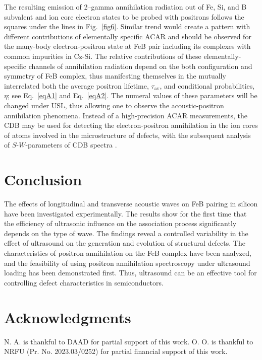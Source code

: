 \documentclass{ttp}
\begin{document}
The resulting emission of 2–gamma annihilation radiation out of Fe, Si, and B subvalent and ion core electron states
to be probed with positrons follows the squares under the lines in Fig.~\ref{fig6}.
Similar trend would create a pattern with different contributions of elementally specific ACAR
and should be observed for the many-body electron-positron state at FeB pair including its complexes with common impurities in Cz-Si.
The relative contributions of these elementally-specific channels of annihilation radiation depend on the both configuration and symmetry of FeB complex,
thus manifesting themselves in the mutually interrelated both the average positron lifetime,
$\tau_\mathrm{av}$, and conditional probabilities, $\eta$;
see Eq.~\ref{eqA1} and Eq.~\ref{eqA2}.
The numeral values of these parameters will be changed under USL,
thus allowing one to observe the acoustic-positron annihilation phenomena.
Instead of a high-precision ACAR measurements, the CDB may be used for detecting the electron-positron annihilation in the ion cores
of atoms involved in the microstructure of defects, with the subsequent analysis of $S$-$W$-parameters of CDB spectra \cite{Krause1999}.

\section{Conclusion}

The effects of longitudinal and transverse acoustic waves on FeB pairing in silicon have been investigated experimentally.
The results show for the first time that the efficiency of ultrasonic influence on the association process significantly depends on the type of wave.
The findings reveal a controlled variability in the effect of ultrasound on the generation and evolution of structural defects.
The characteristics of positron annihilation on the FeB complex have been analyzed,
and the feasibility of using positron annihilation spectroscopy under ultrasound loading has been demonstrated first.
Thus, ultrasound can be an effective tool for controlling defect characteristics in semiconductors.



\section{Acknowledgments}
N. A. is thankful to DAAD for partial support of this work.
O. O. is thankful to NRFU (Pr. No. 2023.03/0252) for partial financial support of this work.
\end{document}
